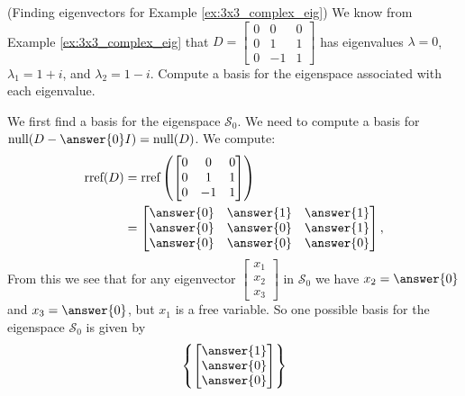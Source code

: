 \documentclass{ximera}
\begin{document}
    \begin{example}\label{ex:3x3_complex_ev} (Finding eigenvectors for Example \ref{ex:3x3_complex_eig})
        We know from Example \ref{ex:3x3_complex_eig} that $D=\begin{bmatrix} 0&0&0\\ 0 &1&1\\ 0 & -1&1\end{bmatrix}$ has eigenvalues $\lambda=0$, $\lambda_1=1+i$, and $\lambda_2=1-i$.  Compute a basis for the eigenspace associated with each eigenvalue.
        \begin{explanation}
        We first find a basis for the eigenspace $\mathcal{S}_0$.  We need to compute a basis for $\mbox{null}(D-\answer{0}I)=\mbox{null}(D)$.  We compute:
        \begin{align*}
        \mbox{rref}(D) &= \mbox{rref}\left(\begin{bmatrix} 0 & 0 & 0\\ 0 & 1 & 1\\ 0 & -1 & 1\end{bmatrix}\right) \\
        &= \begin{bmatrix} \answer{0} & \answer{1} & \answer{1}\\ \answer{0} & \answer{0} & \answer{1}\\ \answer{0} & \answer{0} & \answer{0}\end{bmatrix},
        \end{align*}
        From this we see that for any eigenvector $\begin{bmatrix}x_1\\x_2\\x_3\end{bmatrix}$ in $\mathcal{S}_0$ we have $x_2=\answer{0}$ and $x_3=\answer{0}$, but $x_1$ is a free variable.
        So one possible basis for the eigenspace $\mathcal{S}_0$ is given by $$\left\{\begin{bmatrix}\answer{1}\\\answer{0}\\\answer{0}\end{bmatrix}\right\}$$


\end{explanation}
\end{example}
\end{document}
